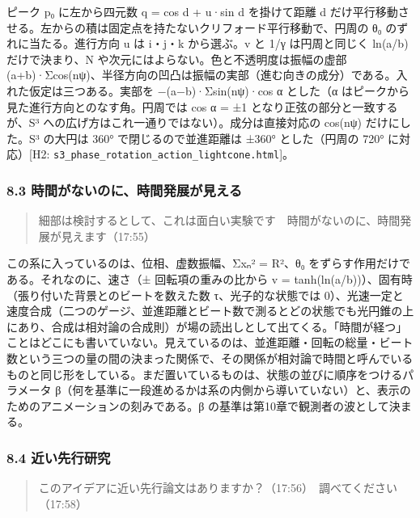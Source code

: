 \documentclass[
  a4paper,
]{ltjsarticle}
\begin{document}
ピーク p₀ に左から四元数 q = cos d + u·sin d を掛けて距離 d
だけ平行移動させる。左からの積は固定点を持たないクリフォード平行移動で、円周の
θ₀ のずれに当たる。進行方向 u は i・j・k から選ぶ。v と 1/γ
は円周と同じく ln(a/b) だけで決まり、N
や次元にはよらない。色と不透明度は振幅の虚部
(a+b)·Σcos(nψ)、半径方向の凹凸は振幅の実部（進む向きの成分）である。入れた仮定は三つある。実部を
−(a−b)·Σsin(nψ)·cos α とした（α
はピークから見た進行方向とのなす角。円周では cos α = ±1
となり正弦の部分と一致するが、S³
への広げ方はこれ一通りではない）。成分は直接対応の cos(nψ)
だけにした。S³ の大円は 360° で閉じるので並進距離は ±360° とした（円周の
720° に対応）{[}H2:
\texttt{s3\_\allowbreak{}phase\_\allowbreak{}rotation\_\allowbreak{}action\_\allowbreak{}lightcone.html}{]}。

\subsubsection{8.3
時間がないのに、時間発展が見える}\label{ux6642ux9593ux304cux306aux3044ux306eux306bux6642ux9593ux767aux5c55ux304cux898bux3048ux308b}

\begin{quote}
細部は検討するとして、これは面白い実験です　時間がないのに、時間発展が見えます（17:55）
\end{quote}

この系に入っているのは、位相、虚数振幅、Σxₙ² = R²、θ₀
をずらす作用だけである。それなのに、速さ（± 回転項の重みの比から v =
tanh(ln(a/b))）、固有時（張り付いた背景とのビートを数えた数
τ、光子的な状態では
0）、光速一定と速度合成（二つのゲージ、並進距離とビート数で測るとどの状態でも光円錐の上にあり、合成は相対論の合成則）が場の読出しとして出てくる。「時間が経つ」ことはどこにも書いていない。見えているのは、並進距離・回転の総量・ビート数という三つの量の間の決まった関係で、その関係が相対論で時間と呼んでいるものと同じ形をしている。まだ置いているものは、状態の並びに順序をつけるパラメータ
β（何を基準に一段進めるかは系の内側から導いていない）と、表示のためのアニメーションの刻みである。β
の基準は第10章で観測者の波として決まる。

\subsubsection{8.4
近い先行研究}\label{ux8fd1ux3044ux5148ux884cux7814ux7a76}

\begin{quote}
このアイデアに近い先行論文はありますか？（17:56）　調べてください（17:58）
\end{quote}
\end{document}
